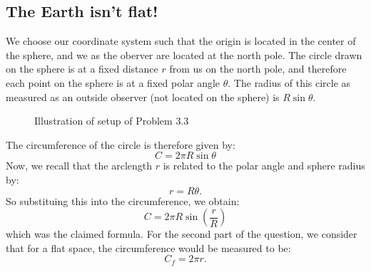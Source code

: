 \subsection{The Earth isn't flat!}
We choose our coordinate system such that the origin is located in the center of the sphere, and we as the oberver are located at the north pole. The circle drawn on the sphere is at a fixed distance $r$ from us on the north pole, and therefore each point on the sphere is at a fixed polar angle $\theta$. The radius of this circle as measured as an outside observer (not located on the sphere) is $R \sin\theta$.
\begin{figure}[htbp]
    \centering
    \caption{Illustration of setup of Problem 3.3}
    \label{fig3.3}
\end{figure}
The circumference of the circle is therefore given by:
\begin{equation}
    C = 2\pi R \sin \theta
\end{equation}
Now, we recall that the arclength $r$ is related to the polar angle and sphere radius by:
\begin{equation}
    r = R\theta.
\end{equation}
So substituing this into the circumference, we obtain:
\begin{equation}\label{circsphere}
    \boxed{C = 2\pi R\sin(\frac{r}{R})}
\end{equation}
which was the claimed formula. For the second part of the question, we consider that for a flat space, the circumference would be measured to be:
\begin{equation}
    C_f = 2\pi r.
\end{equation}
